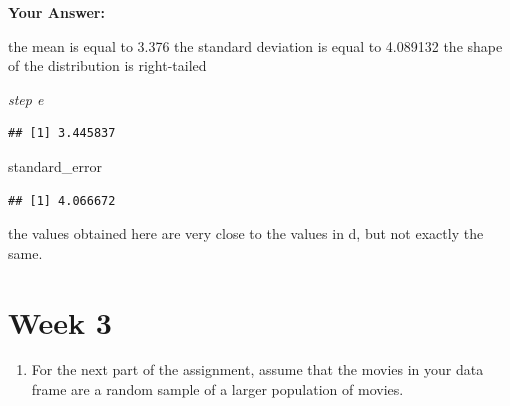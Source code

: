\documentclass[
]{article}
\newenvironment{Shaded}{\begin{snugshade}}{\end{snugshade}}
\newcommand{\AttributeTok}[1]{\textcolor[rgb]{0.13,0.29,0.53}{#1}}
\newcommand{\ConstantTok}[1]{\textcolor[rgb]{0.56,0.35,0.01}{#1}}
\newcommand{\DecValTok}[1]{\textcolor[rgb]{0.00,0.00,0.81}{#1}}
\newcommand{\FunctionTok}[1]{\textcolor[rgb]{0.13,0.29,0.53}{\textbf{#1}}}
\newcommand{\NormalTok}[1]{#1}
\newcommand{\OtherTok}[1]{\textcolor[rgb]{0.56,0.35,0.01}{#1}}
\newcommand{\SpecialCharTok}[1]{\textcolor[rgb]{0.81,0.36,0.00}{\textbf{#1}}}
\providecommand{\tightlist}{%
  \setlength{\itemsep}{0pt}\setlength{\parskip}{0pt}}
\begin{document}
\textbf{Your Answer:}

the mean is equal to 3.376 the standard deviation is equal to 4.089132
the shape of the distribution is right-tailed

\emph{step e}

\begin{Shaded}
\end{Shaded}

\begin{verbatim}
## [1] 3.445837
\end{verbatim}

\begin{Shaded}
\begin{Highlighting}[]
\NormalTok{standard\_error}
\end{Highlighting}
\end{Shaded}

\begin{verbatim}
## [1] 4.066672
\end{verbatim}

the values obtained here are very close to the values in d, but not
exactly the same.

\section{Week 3}\label{week-3}

\begin{enumerate}
\def\labelenumi{\arabic{enumi}.}
\tightlist
\item
  For the next part of the assignment, assume that the movies in your
  data frame are a random sample of a larger population of movies.
\end{enumerate}
\end{document}
